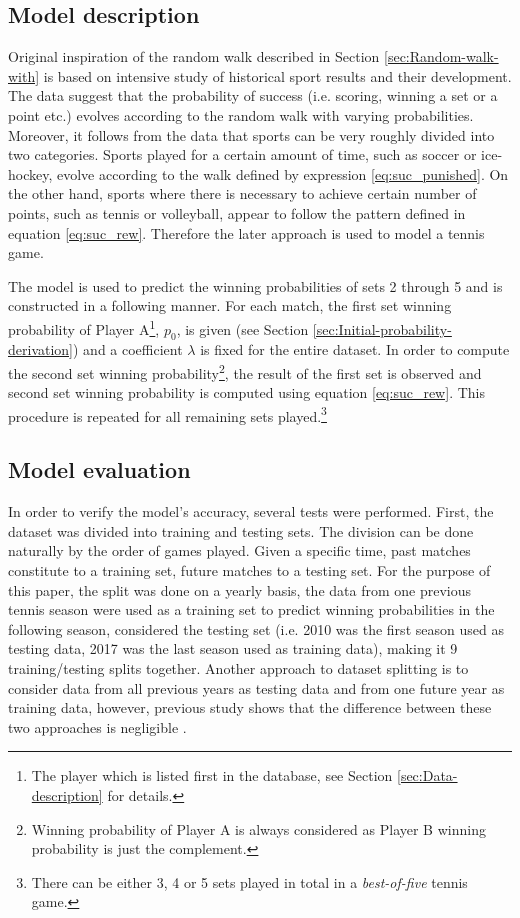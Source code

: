 \documentclass{easychair}
\begin{document}
\subsection{Model description}

Original inspiration of the random walk described in Section \ref{sec:Random-walk-with}
is based on intensive study of historical sport results and their
development. The data suggest that the probability of success (i.e.
scoring, winning a set or a point etc.) evolves according to the random
walk with varying probabilities. Moreover, it follows from the data
that sports can be very roughly divided into two categories. Sports
played for a certain amount of time, such as soccer or ice-hockey,
evolve according to the walk defined by expression \ref{eq:suc_punished}.
On the other hand, sports where there is necessary to achieve certain
number of points, such as tennis or volleyball, appear to follow the
pattern defined in equation \ref{eq:suc_rew}. Therefore the later
approach is used to model a tennis game.

The model is used to predict the winning probabilities of sets 2 through
5 and is constructed in a following manner. For each match, the first
set winning probability of Player A\footnote{The player which is listed first in the database, see Section \ref{sec:Data-description}
for details.}, $p_{0}$, is given (see Section \ref{sec:Initial-probability-derivation})
and a coefficient $\lambda$ is fixed for the entire dataset. In order
to compute the second set winning probability\footnote{Winning probability of Player A is always considered as Player B winning
probability is just the complement.}, the result of the first set is observed and second set winning probability
is computed using equation \ref{eq:suc_rew}. This procedure is repeated
for all remaining sets played.\footnote{There can be either 3, 4 or 5 sets played in total in a \emph{best-of-five}
tennis game.}

\subsection{Model evaluation}

In order to verify the model's accuracy, several tests were performed.
First, the dataset was divided into training and testing sets. The
division can be done naturally by the order of games played. Given
a specific time, past matches constitute to a training set, future
matches to a testing set. For the purpose of this paper, the split
was done on a yearly basis, the data from one previous tennis season
were used as a training set to predict winning probabilities in the
following season, considered the testing set (i.e. 2010 was the first
season used as testing data, 2017 was the last season used as training
data), making it 9 training/testing splits together. Another approach
to dataset splitting is to consider data from all previous years as
testing data and from one future year as training data, however, previous
study shows that the difference between these two approaches is negligible
\cite{ja2016ddny}.
\end{document}

